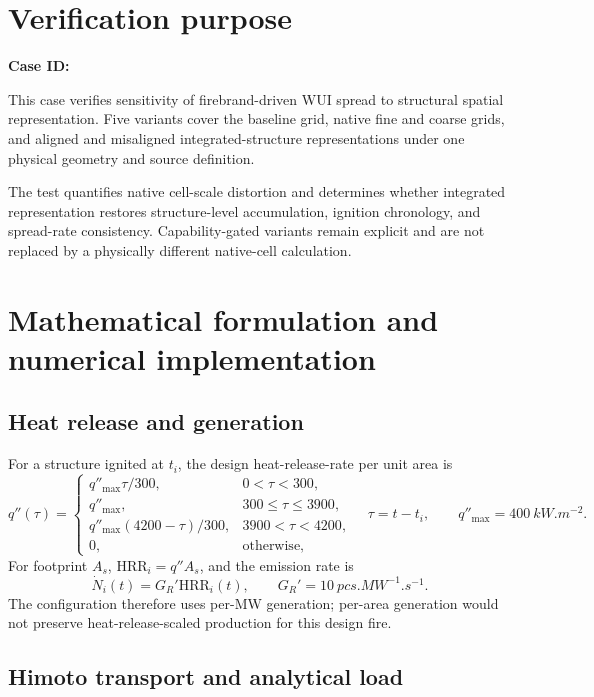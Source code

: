 \section{Verification purpose}

\textbf{Case ID:} \CaseID

This case verifies sensitivity of firebrand-driven WUI spread to structural spatial representation. Five variants cover the baseline grid, native fine and coarse grids, and aligned and misaligned integrated-structure representations under one physical geometry and source definition.

The test quantifies native cell-scale distortion and determines whether integrated representation restores structure-level accumulation, ignition chronology, and spread-rate consistency. Capability-gated variants remain explicit and are not replaced by a physically different native-cell calculation.

\section{Mathematical formulation and numerical implementation}

\subsection{Heat release and generation}

For a structure ignited at \(t_i\), the design heat-release-rate per unit area is
\[
q''(\tau)=
\begin{cases}
q''_{\max}\tau/300,&0<\tau<300,\\
q''_{\max},&300\le\tau\le3900,\\
q''_{\max}(4200-\tau)/300,&3900<\tau<4200,\\
0,&\text{otherwise},
\end{cases}
\quad \tau=t-t_i,\qquad q''_{\max}=\SI{400}{kW.m^{-2}}.
\]
For footprint \(A_s\), \(\mathrm{HRR}_i=q''A_s\), and the emission rate is
\[
\dot N_i(t)=G_R'\mathrm{HRR}_i(t),\qquad
G_R'=\SI{10}{pcs.MW^{-1}.s^{-1}}.
\]
The configuration therefore uses per-MW generation; per-area generation would
not preserve heat-release-scaled production for this design fire.

\subsection{Himoto transport and analytical load}

